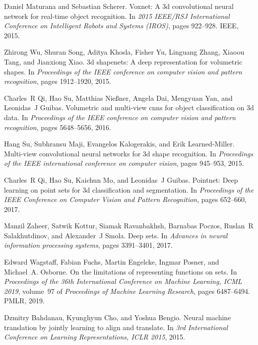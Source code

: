 \documentclass{ieeeaccess}
\begin{document}
\begin{thebibliography}{10}
Daniel Maturana and Sebastian Scherer.
\newblock Voxnet: A 3d convolutional neural network for real-time object
  recognition.
\newblock In {\em 2015 IEEE/RSJ International Conference on Intelligent Robots
  and Systems (IROS)}, pages 922--928. IEEE, 2015.

Zhirong Wu, Shuran Song, Aditya Khosla, Fisher Yu, Linguang Zhang, Xiaoou Tang,
  and Jianxiong Xiao.
\newblock 3d shapenets: A deep representation for volumetric shapes.
\newblock In {\em Proceedings of the IEEE conference on computer vision and
  pattern recognition}, pages 1912--1920, 2015.

Charles~R Qi, Hao Su, Matthias Nie{\ss}ner, Angela Dai, Mengyuan Yan, and
  Leonidas~J Guibas.
\newblock Volumetric and multi-view cnns for object classification on 3d data.
\newblock In {\em Proceedings of the IEEE conference on computer vision and
  pattern recognition}, pages 5648--5656, 2016.

Hang Su, Subhransu Maji, Evangelos Kalogerakis, and Erik Learned-Miller.
\newblock Multi-view convolutional neural networks for 3d shape recognition.
\newblock In {\em Proceedings of the IEEE international conference on computer
  vision}, pages 945--953, 2015.

Charles~R Qi, Hao Su, Kaichun Mo, and Leonidas~J Guibas.
\newblock Pointnet: Deep learning on point sets for 3d classification and
  segmentation.
\newblock In {\em Proceedings of the IEEE Conference on Computer Vision and
  Pattern Recognition}, pages 652--660, 2017.

Manzil Zaheer, Satwik Kottur, Siamak Ravanbakhsh, Barnabas Poczos, Ruslan~R
  Salakhutdinov, and Alexander~J Smola.
\newblock Deep sets.
\newblock In {\em Advances in neural information processing systems}, pages
  3391--3401, 2017.

Edward Wagstaff, Fabian Fuchs, Martin Engelcke, Ingmar Posner, and Michael~A.
  Osborne.
\newblock On the limitations of representing functions on sets.
\newblock In {\em Proceedings of the 36th International Conference on Machine
  Learning, {ICML} 2019}, volume~97 of {\em Proceedings of Machine Learning
  Research}, pages 6487--6494. {PMLR}, 2019.

Dzmitry Bahdanau, Kyunghyun Cho, and Yoshua Bengio.
\newblock Neural machine translation by jointly learning to align and
  translate.
\newblock In {\em 3rd International Conference on Learning Representations,
  {ICLR} 2015}, 2015.


\end{thebibliography}
\end{document}
